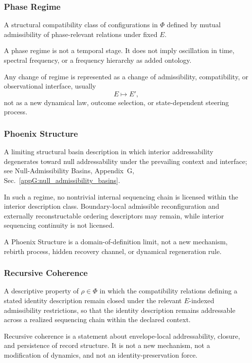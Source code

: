 \documentclass[aps,prx,onecolumn,11pt]{revtex4-2}
\theoremstyle{plain}
\theoremstyle{definition}
\theoremstyle{remark}
\begin{document}
\subsubsection*{Phase Regime}

A structural compatibility class of configurations in \(\Phi\) defined
by mutual admissibility of phase-relevant relations under fixed \(E\).

A phase regime is not a temporal stage. It does not imply oscillation in
time, spectral frequency, or a frequency hierarchy as added ontology.

Any change of regime is represented as a change of admissibility,
compatibility, or observational interface, usually
\[
E\mapsto E',
\]
not as a new dynamical law, outcome selection, or state-dependent
steering process.

\subsubsection*{Phoenix Structure}

A limiting structural basin description in which interior
addressability degenerates toward null addressability under the
prevailing context and interface; see Null-Admissibility Basins,
Appendix~G, Sec.~\ref{appG:null_admissibility_basins}.

In such a regime, no nontrivial internal sequencing chain is licensed
within the interior description class. Boundary-local admissible
reconfiguration and externally reconstructable ordering descriptors may
remain, while interior sequencing continuity is not licensed.

A Phoenix Structure is a domain-of-definition limit, not a new
mechanism, rebirth process, hidden recovery channel, or dynamical
regeneration rule.

\subsubsection*{Recursive Coherence}

A descriptive property of \(\rho\in\Phi\) in which the compatibility
relations defining a stated identity description remain closed under
the relevant \(E\)-indexed admissibility restrictions, so that the
identity description remains addressable across a realized sequencing
chain within the declared context.

Recursive coherence is a statement about envelope-local addressability,
closure, and persistence of record structure. It is not a new mechanism,
not a modification of dynamics, and not an identity-preservation force.
\end{document}
